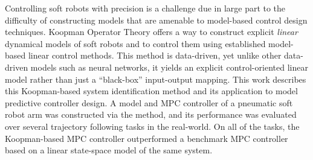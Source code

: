 Controlling soft robots with precision is a challenge due in large part to the difficulty of constructing models that are amenable to model-based control design techniques.
Koopman Operator Theory offers a way to construct explicit \emph{linear} dynamical models of soft robots and to control them using established model-based linear control methods.
This method is data-driven, yet unlike other data-driven models such as neural networks, it yields an explicit control-oriented linear model rather than just a ``black-box'' input-output mapping.
This work describes this Koopman-based system identification method and its application to model predictive controller design.
A model and MPC controller of a pneumatic soft robot arm was constructed via the method, and its performance was evaluated over several trajectory following tasks in the real-world. 
On all of the tasks, the Koopman-based MPC controller outperformed a benchmark MPC controller based on a linear state-space model of the same system.